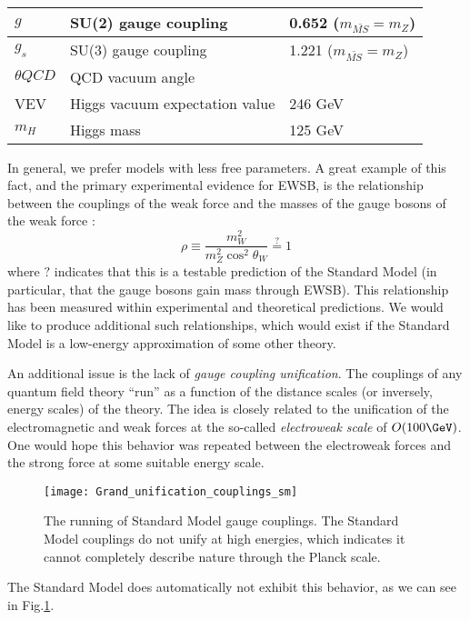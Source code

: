 \begin{table}
\begin{tabular}{| l | l | l |}
$g$               & SU(2) gauge coupling           & 0.652     ($m_{\bar{MS}} = m_Z$)                         \\ \hline
$g_s$             & SU(3) gauge coupling           & 1.221     ($m_{\bar{MS}} = m_Z$)                         \\ \hline
$\theta{QCD}$     & QCD vacuum angle               & \order 0                          \\ \hline
VEV               & Higgs vacuum expectation value & 246 GeV                           \\ \hline
$m_H$             & Higgs mass                     & 125 GeV                           \\ \hline
\end{tabular}
\end{table}
In general, we prefer models with less free parameters.
A great example of this fact, and the primary experimental evidence for EWSB, is the relationship between the couplings of the weak force and the masses of the gauge bosons of the weak force :
\begin{equation}
\rho \equiv \frac{m_W^2}{m_Z^2 \cos^2 \theta_W } \stackrel{?}{=} 1
\end{equation}
where $?$ indicates that this is a testable prediction of the Standard Model (in particular, that the gauge bosons gain mass through EWSB).
This relationship has been measured  within experimental and theoretical predictions.
We would like to produce additional such relationships, which would exist if the Standard Model is a low-energy approximation of some other theory.

An additional issue is the lack of \textit{gauge coupling unification}.
The couplings of any quantum field theory ``run'' as a function of the distance scales (or inversely, energy scales) of the theory.
The idea is closely related to the unification of the electromagnetic and weak forces at the so-called \textit{electroweak scale} of $O(100 \GeV)$.
One would hope this behavior was repeated between the electroweak forces and the strong force at some suitable energy scale.
\begin{figure}
\caption{The running of Standard Model gauge couplings.  The Standard Model couplings do not unify at high energies, which indicates it cannot completely describe nature through the Planck scale.} \label{fig:sm_gauge_coupling}
\texttt{[image: Grand\_unification\_couplings\_sm]}
\end{figure}
The Standard Model does automatically not exhibit this behavior, as we can see in Fig.\ref{fig:sm_gauge_coupling}.

